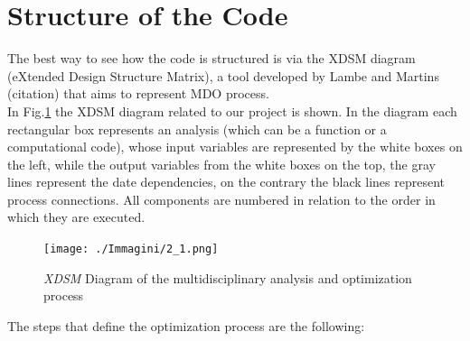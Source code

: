 \section{Structure of the Code}
The best way to see how the code is structured is via the XDSM diagram (eXtended Design Structure Matrix), a tool developed by Lambe and Martins (citation) that aims to represent MDO process. \\
 In  Fig.\ref{fig:2_1} the XDSM diagram related to our project is shown. In the diagram each rectangular box represents an analysis (which can be a function or a computational code), whose input variables are represented by the white boxes on the left, while the output variables from the white boxes on the top, the gray lines represent the date dependencies, on the contrary the black lines represent process connections. All components are numbered in relation to the order in which they are executed.
\begin{figure}[H]
	\centering
	\texttt{[image: ./Immagini/2\_1.png]}
	\caption{\textit{XDSM} Diagram of the multidisciplinary analysis and optimization process}
	\label{fig:2_1}
\end{figure}
The steps that define the optimization process are the following:

